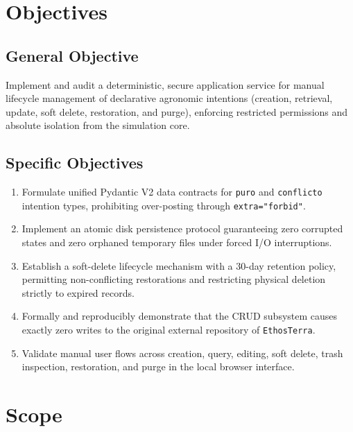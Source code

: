 \documentclass[11pt,a4paper]{article}
\begin{document}
\section{Objectives}

\subsection{General Objective}
Implement and audit a deterministic, secure application service for manual lifecycle management of declarative agronomic intentions (creation, retrieval, update, soft delete, restoration, and purge), enforcing restricted permissions and absolute isolation from the simulation core.

\subsection{Specific Objectives}
\begin{enumerate}[itemsep=2pt]
    \item Formulate unified Pydantic V2 data contracts for \texttt{puro} and \texttt{conflicto} intention types, prohibiting over-posting through \texttt{extra="forbid"}.
    \item Implement an atomic disk persistence protocol guaranteeing zero corrupted states and zero orphaned temporary files under forced I/O interruptions.
    \item Establish a soft-delete lifecycle mechanism with a 30-day retention policy, permitting non-conflicting restorations and restricting physical deletion strictly to expired records.
    \item Formally and reproducibly demonstrate that the CRUD subsystem causes exactly zero writes to the original external repository of \texttt{EthosTerra}.
    \item Validate manual user flows across creation, query, editing, soft delete, trash inspection, restoration, and purge in the local browser interface.
\end{enumerate}

\section{Scope}
\end{document}
